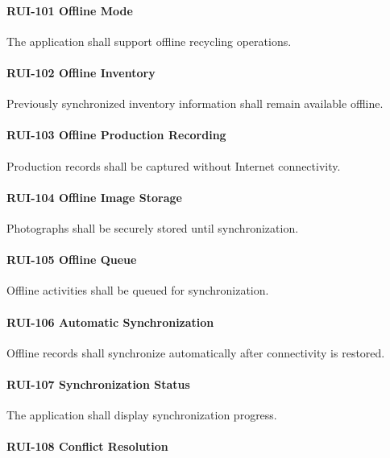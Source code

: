 \paragraph{RUI-101 Offline Mode}

The application shall support offline recycling operations.

\paragraph{RUI-102 Offline Inventory}

Previously synchronized inventory information shall remain available
offline.

\paragraph{RUI-103 Offline Production Recording}

Production records shall be captured without Internet connectivity.

\paragraph{RUI-104 Offline Image Storage}

Photographs shall be securely stored until synchronization.

\paragraph{RUI-105 Offline Queue}

Offline activities shall be queued for synchronization.

\paragraph{RUI-106 Automatic Synchronization}

Offline records shall synchronize automatically after connectivity is
restored.

\paragraph{RUI-107 Synchronization Status}

The application shall display synchronization progress.

\paragraph{RUI-108 Conflict Resolution}

